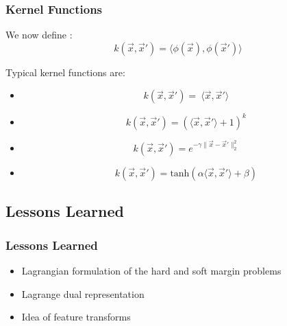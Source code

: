 \begin{frame}
  \frametitle{Kernel Functions}
  
  We now define :
  \begin{displaymath}
    k(\vec x, \vec x') =  \langle \phi(\vec x), \phi(\vec x') \rangle
  \end{displaymath}
  \pspread
 
  Typical kernel functions are: \\[.25cm]
 
  \small
  \begin{itemize}
    \item {} 
      \begin{displaymath}
        k(\vec x, \vec x') =~ \langle\vec x, \vec x'\rangle
      \end{displaymath}
    \item {} 
      \begin{displaymath}
        k(\vec x, \vec x') = (\langle\vec x, \vec x'\rangle + 1)^k
      \end{displaymath}
    \item {} 
      \begin{displaymath}
        k(\vec x, \vec x') = e^{-\gamma\|\vec x- \vec x'\|_2^2}
      \end{displaymath}
    \item {} 
      \begin{displaymath}
        k(\vec x, \vec x') =\mbox{tanh}({ \alpha \langle\vec x, \vec x'\rangle + \beta})
      \end{displaymath}
  \end{itemize}
\end{frame}


\subsection{Lessons Learned}

\begin{frame}
  \frametitle{Lessons Learned}
  
  \begin{itemize}
    \item Lagrangian formulation of the hard and soft margin problems \\[.5cm]
    \item Lagrange dual representation \\[.5cm]
    \item Idea of feature transforms
  \end{itemize}
\end{frame}

